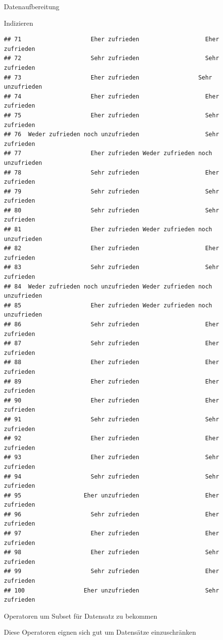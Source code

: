 \documentclass[ignorenonframetext,]{beamer}
\begin{document}
\begin{frame}[fragile]{Datenaufbereitung}
\begin{block}{Indizieren}
\begin{verbatim}
## 71                    Eher zufrieden                   Eher zufrieden
## 72                    Sehr zufrieden                   Sehr zufrieden
## 73                    Eher zufrieden                 Sehr unzufrieden
## 74                    Eher zufrieden                   Eher zufrieden
## 75                    Eher zufrieden                   Sehr zufrieden
## 76  Weder zufrieden noch unzufrieden                   Sehr zufrieden
## 77                    Eher zufrieden Weder zufrieden noch unzufrieden
## 78                    Sehr zufrieden                   Eher zufrieden
## 79                    Sehr zufrieden                   Sehr zufrieden
## 80                    Sehr zufrieden                   Sehr zufrieden
## 81                    Eher zufrieden Weder zufrieden noch unzufrieden
## 82                    Eher zufrieden                   Eher zufrieden
## 83                    Sehr zufrieden                   Sehr zufrieden
## 84  Weder zufrieden noch unzufrieden Weder zufrieden noch unzufrieden
## 85                    Eher zufrieden Weder zufrieden noch unzufrieden
## 86                    Sehr zufrieden                   Eher zufrieden
## 87                    Sehr zufrieden                   Eher zufrieden
## 88                    Eher zufrieden                   Eher zufrieden
## 89                    Eher zufrieden                   Eher zufrieden
## 90                    Eher zufrieden                   Eher zufrieden
## 91                    Sehr zufrieden                   Sehr zufrieden
## 92                    Eher zufrieden                   Eher zufrieden
## 93                    Eher zufrieden                   Sehr zufrieden
## 94                    Sehr zufrieden                   Sehr zufrieden
## 95                  Eher unzufrieden                   Eher zufrieden
## 96                    Sehr zufrieden                   Eher zufrieden
## 97                    Eher zufrieden                   Eher zufrieden
## 98                    Eher zufrieden                   Sehr zufrieden
## 99                    Sehr zufrieden                   Eher zufrieden
## 100                 Eher unzufrieden                   Sehr zufrieden
\end{verbatim}

\end{block}

\begin{block}{Operatoren um Subset für Datensatz zu bekommen}

Diese Operatoren eignen sich gut um Datensätze einzuschränken


\end{block}
\end{frame}
\end{document}
